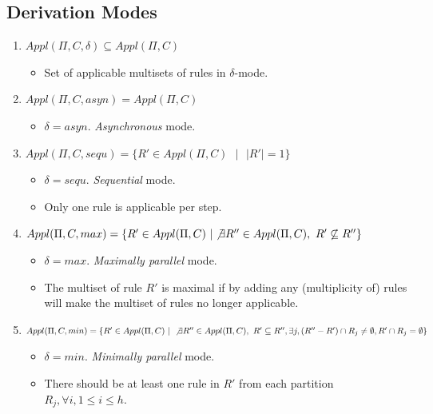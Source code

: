 \documentclass{article}
\newcommand{\s}{\text{ }}
\begin{document}
\begin{appendices}

\subsection{Derivation Modes} \label{a-ff1-derive}

\begin{enumerate}
   \item $Appl(\Pi, C, \delta) \subseteq Appl(\Pi, C)$ 
         \begin{itemize}
         \item Set of applicable multisets of rules in $\delta$-mode.
         \end{itemize}
   \item $Appl(\Pi, C, asyn) = Appl(\Pi, C)$
         \begin{itemize}
         \item $\delta = asyn$. \textit{Asynchronous} mode.
         \end{itemize}
   \item $Appl(\Pi, C, sequ) = \{R' \in Appl(\Pi, C) \s | \s |R'|=1\}$
         \begin{itemize}
         \item $\delta = sequ$. \textit{Sequential} mode.
         \item Only one rule is applicable per step.
         \end{itemize}
   \item $Appl(\Pi, C, max) = \{R' \in Appl(\Pi, C) \s | \not\exists R'' \in Appl(\Pi, C), \s R' \not\subseteq R'' \}$
         \begin{itemize}
         \item $\delta = max$. \textit{Maximally parallel} mode.
         \item The multiset of rule $R'$ is maximal if by adding any (multiplicity of) rules will make the multiset of rules no longer applicable.
         \end{itemize}
   \item $Appl(\Pi, C, min) = \{R' \in Appl(\Pi, C) \s | \s \not\exists R'' \in Appl(\Pi,C), \s R' \subseteq R'', \exists j, (R''-R') \cap R_j \neq \emptyset, R' \cap R_j = \emptyset\}$
         \begin{itemize}
         \item $\delta = min$. \textit{Minimally parallel} mode.
         \item There should be at least one rule in $R'$ from each partition $R_j, \forall i, 1 \leq i \leq h$.

\end{itemize}
\end{enumerate}
\end{appendices}
\end{document}
